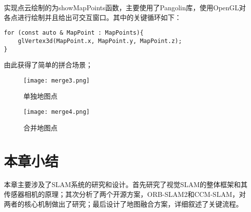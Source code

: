 实现点云绘制的为showMapPoints函数，主要使用了Pangolin库，使用OpenGL对各点进行绘制并且给出可交互窗口。其中的关键循环如下：

\begin{verbatim}
for (const auto & MapPoint : MapPoints){
    glVertex3d(MapPoint.x, MapPoint.y, MapPoint.z);
}
\end{verbatim}

由此获得了简单的拼合场景；

\begin{figure}[htbp]
	\centering
	\begin{minipage}[t]{0.45\columnwidth} %
		\centering
		\texttt{[image: merge3.png]}
		\caption{单独地图点}
		\label{merge1}
	\end{minipage}
	\begin{minipage}[t]{0.45\columnwidth}
		\centering
		\texttt{[image: merge4.png]}
		\caption{合并地图点}
		\label{merge2}
	\end{minipage}
\end{figure}


\section{本章小结}

本章主要涉及了SLAM系统的研究和设计。首先研究了视觉SLAM的整体框架和其传感器相机的原理；其次分析了两个开源方案，ORB-SLAM2和CCM-SLAM，对两者的核心机制做出了研究；最后设计了地图融合方案，详细叙述了关键流程。






